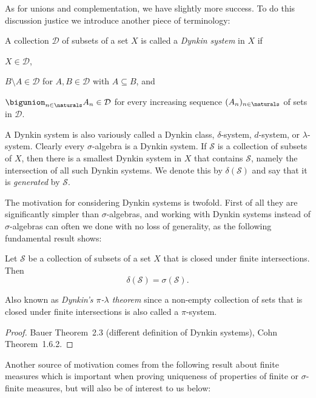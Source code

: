 \documentclass[article, a4paper, 11pt, oneside]{memoir}
\numberwithin{equation}{chapter}
\newcommand{\calD}{\mathcal{D}}
\newcommand{\calS}{\mathcal{S}}
\begin{document}
As for unions and complementation, we have slightly more success. To do this discussion justice we introduce another piece of terminology:

\begin{definition}
    A collection $\calD$ of subsets of a set $X$ is called a \emph{Dynkin system} in $X$ if
    \begin{enumdef}
        \item $X \in \calD$,
        \item $B \setminus A \in \calD$ for $A,B \in \calD$ with $A \subseteq B$, and
        \item $\bigunion_{n\in\naturals} A_n \in \calD$ for every increasing sequence $(A_n)_{n\in\naturals}$ of sets in $\calD$.
    \end{enumdef}
\end{definition}
%
A Dynkin system is also variously called a Dynkin class, $\delta$-system, $d$-system, or $\lambda$-system. Clearly every $\sigma$-algebra is a Dynkin system. If $\calS$ is a collection of subsets of $X$, then there is a smallest Dynkin system in $X$ that contains $\calS$, namely the intersection of all such Dynkin systems. We denote this by $\delta(\calS)$ and say that it is \emph{generated} by $\calS$.

The motivation for considering Dynkin systems is twofold. First of all they are significantly simpler than $\sigma$-algebras, and working with Dynkin systems instead of $\sigma$-algebras can often we done with no loss of generality, as the following fundamental result shows:

\begin{theorem}
    Let $\calS$ be a collection of subsets of a set $X$ that is closed under finite intersections. Then
    \begin{equation*}
        \delta(\calS) = \sigma(\calS).
    \end{equation*}
\end{theorem}
%
Also known as \emph{Dynkin's $\pi$-$\lambda$ theorem} since a non-empty collection of sets that is closed under finite intersections is also called a $\pi$-system.

\begin{proof}
    Bauer Theorem~2.3 (different definition of Dynkin systems), Cohn Theorem~1.6.2.
\end{proof}

Another source of motivation comes from the following result about finite measures which is important when proving uniqueness of properties of finite or $\sigma$-finite measures, but will also be of interest to us below:
\end{document}
